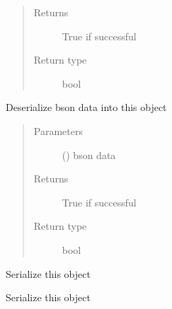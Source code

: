 \documentclass[letterpaper,10pt,english]{sphinxmanual}
\begin{document}
\begin{fulllineitems}
\begin{fulllineitems}
\begin{quote}
\begin{description}
\item[{Returns}] \leavevmode
True if successful

\item[{Return type}] \leavevmode
bool

\end{description}\end{quote}

\end{fulllineitems}


\begin{fulllineitems}
\label{\detokenize{bbc1.core.bbclib:bbc1.core.bbclib.BBcWitness.deserialize_bson}}
Deserialize bson data into this object
\begin{quote}\begin{description}
\item[{Parameters}] \leavevmode
{} () \textendash{} bson data

\item[{Returns}] \leavevmode
True if successful

\item[{Return type}] \leavevmode
bool

\end{description}\end{quote}

\end{fulllineitems}


\begin{fulllineitems}
\label{\detokenize{bbc1.core.bbclib:bbc1.core.bbclib.BBcWitness.serialize}}
Serialize this object

\end{fulllineitems}


\begin{fulllineitems}
\label{\detokenize{bbc1.core.bbclib:bbc1.core.bbclib.BBcWitness.serialize_bson}}
Serialize this object

\end{fulllineitems}


\end{fulllineitems}
\end{document}
